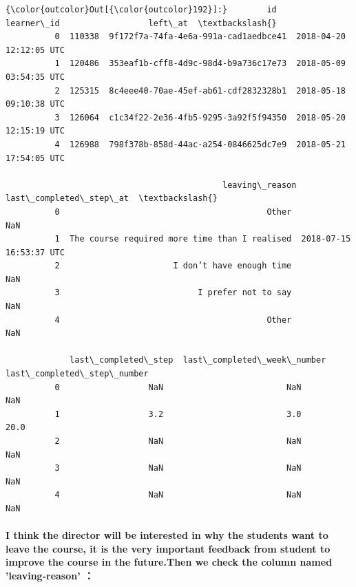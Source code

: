 \documentclass[11pt]{article}
\begin{document}
\begin{Verbatim}[commandchars=\\\{\}]
{\color{outcolor}Out[{\color{outcolor}192}]:}        id                            learner\_id                  left\_at  \textbackslash{}
          0  110338  9f172f7a-74fa-4e6a-991a-cad1aedbce41  2018-04-20 12:12:05 UTC   
          1  120486  353eaf1b-cff8-4d9c-98d4-b9a736c17e73  2018-05-09 03:54:35 UTC   
          2  125315  8c4eee40-70ae-45ef-ab61-cdf2832328b1  2018-05-18 09:10:38 UTC   
          3  126064  c1c34f22-2e36-4fb5-9295-3a92f5f94350  2018-05-20 12:15:19 UTC   
          4  126988  798f378b-858d-44ac-a254-0846625dc7e9  2018-05-21 17:54:05 UTC   
          
                                            leaving\_reason   last\_completed\_step\_at  \textbackslash{}
          0                                          Other                      NaN   
          1  The course required more time than I realised  2018-07-15 16:53:37 UTC   
          2                       I don’t have enough time                      NaN   
          3                            I prefer not to say                      NaN   
          4                                          Other                      NaN   
          
             last\_completed\_step  last\_completed\_week\_number  last\_completed\_step\_number  
          0                  NaN                         NaN                         NaN  
          1                  3.2                         3.0                        20.0  
          2                  NaN                         NaN                         NaN  
          3                  NaN                         NaN                         NaN  
          4                  NaN                         NaN                         NaN  
\end{Verbatim}
            
    \paragraph{I think the director will be interested in why the students
want to leave the course, it is the very important feedback from student
to improve the course in the future.Then we check the column named
'leaving-reason'
：}\label{i-think-the-director-will-be-interested-in-why-the-students-want-to-leave-the-course-it-is-the-very-important-feedback-from-student-to-improve-the-course-in-the-future.then-we-check-the-column-named-leaving-reason}
\end{document}
